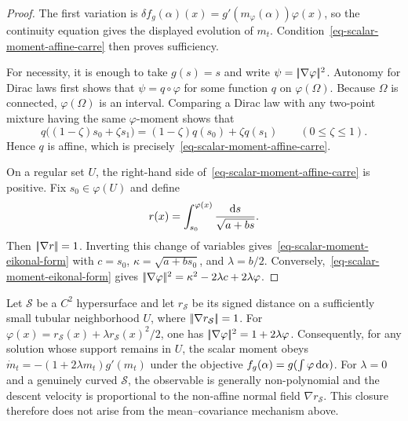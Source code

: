 \begin{proof}
	The first variation is $\delta f_g(\alpha)(x)=g'(m_\varphi(\alpha))\varphi(x)$, so the continuity equation gives the displayed evolution of $m_t$. Condition~\eqref{eq-scalar-moment-affine-carre} then proves sufficiency.

	For necessity, it is enough to take $g(s)=s$ and write $\psi=|\!| \nabla\varphi |\!|^2$. Autonomy for Dirac laws first shows that $\psi=q\circ\varphi$ for some function $q$ on $\varphi(\Omega)$. Because $\Omega$ is connected, $\varphi(\Omega)$ is an interval. Comparing a Dirac law with any two-point mixture having the same $\varphi$-moment shows that
	\[
		q\bigl((1-\zeta)s_0+\zeta s_1\bigr)
		=
		(1-\zeta)q(s_0)+\zeta q(s_1)
		\qquad (0\leq\zeta\leq1).
	\]
	Hence $q$ is affine, which is precisely~\eqref{eq-scalar-moment-affine-carre}.

	On a regular set $U$, the right-hand side of~\eqref{eq-scalar-moment-affine-carre} is positive. Fix $s_0\in\varphi(U)$ and define
	\[
		r(x)=\int_{s_0}^{\varphi(x)}\frac{\mathrm{d} s}{\sqrt{a+bs}}.
	\]
	Then $|\!| \nabla r |\!|=1$. Inverting this change of variables gives~\eqref{eq-scalar-moment-eikonal-form} with $c=s_0$, $\kappa=\sqrt{a+bs_0}$, and $\lambda=b/2$. Conversely,~\eqref{eq-scalar-moment-eikonal-form} gives
	$|\!| \nabla\varphi |\!|^2=\kappa^2-2\lambda c+2\lambda\varphi$.
\end{proof}

\begin{example}
	Let $\mathcal S$ be a $C^2$ hypersurface and let $r_{\mathcal S}$ be its signed distance on a sufficiently small tubular neighborhood $U$, where $|\!| \nabla r_{\mathcal S} |\!|=1$. For
	$\varphi(x)=r_{\mathcal S}(x)+\lambda r_{\mathcal S}(x)^2/2$, one has $|\!| \nabla\varphi |\!|^2=1+2\lambda\varphi$. Consequently, for any solution whose support remains in $U$, the scalar moment obeys $\dot m_t=-(1+2\lambda m_t)g'(m_t)$ under the objective $f_g(\alpha)=g(\int\varphi\,\mathrm{d}\alpha)$.
	For $\lambda=0$ and a genuinely curved $\mathcal S$, the observable is generally non-polynomial and the descent velocity is proportional to the non-affine normal field $\nabla r_{\mathcal S}$. This closure therefore does not arise from the mean--covariance mechanism above.
\end{example}
